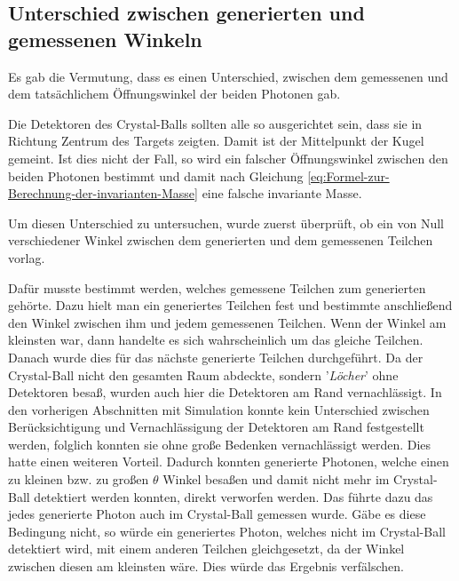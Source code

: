 \documentclass[a4paper,11pt,oneside,final,german,openbib,pdftex]{scrbook}
\begin{document}
{\subsection{Unterschied zwischen generierten und gemessenen Winkeln}
\label{sec:Unterschied-tatsaechlicher-gemessener-Winkel}

Es gab die Vermutung, dass es einen Unterschied, zwischen dem gemessenen und dem tatsächlichem Öffnungswinkel der beiden Photonen gab.

Die Detektoren des Crystal-Balls sollten alle so ausgerichtet sein, dass sie in Richtung Zentrum des Targets zeigten. Damit ist der Mittelpunkt der Kugel gemeint. Ist dies nicht der Fall, so wird ein falscher Öffnungswinkel zwischen den beiden Photonen bestimmt und damit nach Gleichung \ref{eq:Formel-zur-Berechnung-der-invarianten-Masse} eine falsche invariante Masse.

Um diesen Unterschied zu untersuchen, wurde zuerst überprüft, ob ein von Null verschiedener Winkel zwischen dem generierten und dem gemessenen Teilchen vorlag.

Dafür musste bestimmt werden, welches gemessene Teilchen zum generierten gehörte. Dazu hielt man ein generiertes Teilchen fest und bestimmte anschließend den Winkel zwischen ihm und jedem gemessenen Teilchen. Wenn der Winkel am kleinsten war, dann handelte es sich wahrscheinlich um das gleiche Teilchen. Danach wurde dies für das nächste generierte Teilchen durchgeführt. Da der Crystal-Ball nicht den gesamten Raum abdeckte, sondern '\textit{Löcher}' ohne Detektoren besaß, wurden auch hier die Detektoren am Rand vernachlässigt. In den vorherigen Abschnitten mit Simulation konnte kein Unterschied zwischen Berücksichtigung und Vernachlässigung der Detektoren am Rand festgestellt werden, folglich konnten sie ohne große Bedenken vernachlässigt werden. Dies hatte einen weiteren Vorteil. Dadurch konnten generierte Photonen, welche einen zu kleinen bzw. zu großen $\theta$ Winkel besaßen und damit nicht mehr im Crystal-Ball detektiert werden konnten, direkt verworfen werden. Das führte dazu das jedes generierte Photon auch im Crystal-Ball gemessen wurde. Gäbe es diese Bedingung nicht, so würde ein generiertes Photon, welches nicht im Crystal-Ball detektiert wird, mit einem anderen Teilchen gleichgesetzt, da der Winkel zwischen diesen am kleinsten wäre. Dies würde das Ergebnis verfälschen. 

}
\end{document}
